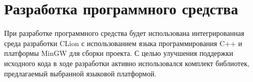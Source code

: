 \section{Разработка программного средства}
\label{sec:func}

При разработке программного средства будет использована
интегрированная среда разработки CLion
с использованием языка программирования C++
и платформы MinGW для сборки проекта.
С целью улучшения поддержки исходного кода в ходе разработки активно использовался комплект библиотек,
предлагаемый выбранной языковой платформой.



